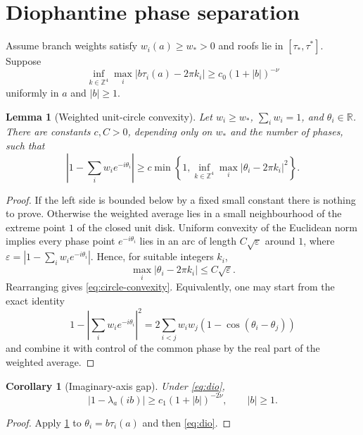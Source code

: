 \documentclass[11pt,reqno]{amsart}
\newtheorem{lemma}[theorem]{Lemma}
\newtheorem{corollary}[theorem]{Corollary}
\theoremstyle{definition}
\theoremstyle{remark}
\newcommand{\R}{\mathbb R}
\newcommand{\abs}[1]{\left\lvert#1\right\rvert}
\begin{document}
\section{Diophantine phase separation}

Assume branch weights satisfy $w_i(a)\ge w_*>0$ and roofs lie in
$[\tau_*,\tau^*]$.  Suppose
\begin{equation}\label{eq:dio}
 \inf_{k\in\mathbb Z^4}
 \max_i\abs{b\tau_i(a)-2\pi k_i}
 \ge c_0(1+\abs b)^{-\nu}
\end{equation}
uniformly in $a$ and $\abs b\ge1$.

\begin{lemma}[Weighted unit-circle convexity]\label{lem:circle}
Let $w_i\ge w_*$, $\sum_iw_i=1$, and $\theta_i\in\R$.  There are constants
$c,C>0$, depending only on $w_*$ and the number of phases, such that
\begin{equation}\label{eq:circle-convexity}
 \abs{1-\sum_iw_ie^{-i\theta_i}}
 \ge c\min\left\{1,
 \inf_{k\in\mathbb Z^4}\max_i\abs{\theta_i-2\pi k_i}^2\right\}.
\end{equation}
\end{lemma}

\begin{proof}
If the left side is bounded below by a fixed small constant there is nothing to
prove.  Otherwise the weighted average lies in a small neighbourhood of the
extreme point $1$ of the closed unit disk.  Uniform convexity of the Euclidean
norm implies every phase point $e^{-i\theta_i}$ lies in an arc of length
$C\sqrt\varepsilon$ around $1$, where
$\varepsilon=\abs{1-\sum_iw_ie^{-i\theta_i}}$.  Hence, for suitable integers
$k_i$,
\[
 \max_i\abs{\theta_i-2\pi k_i}\le C\sqrt\varepsilon.
\]
Rearranging gives \eqref{eq:circle-convexity}.  Equivalently, one may start
from the exact identity
\[
 1-\abs{\sum_iw_ie^{-i\theta_i}}^2
 =2\sum_{i<j}w_iw_j(1-\cos(\theta_i-\theta_j))
\]
and combine it with control of the common phase by the real part of the
weighted average.
\end{proof}

\begin{corollary}[Imaginary-axis gap]\label{cor:imaginary-gap}
Under \eqref{eq:dio},
\[
 \abs{1-\lambda_a(ib)}
 \ge c_1(1+\abs b)^{-2\nu},
 \qquad \abs b\ge1.
\]
\end{corollary}

\begin{proof}
Apply \cref{lem:circle} to $\theta_i=b\tau_i(a)$ and then
\eqref{eq:dio}.
\end{proof}
\end{document}
